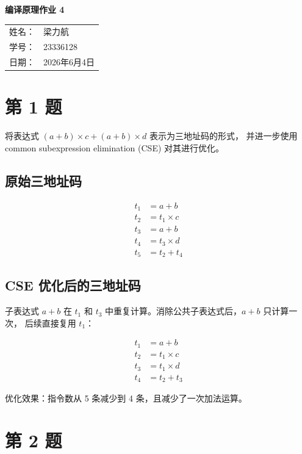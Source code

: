 \documentclass[12pt]{article}
\begin{document}
\begin{center}
    {\LARGE\bfseries 编译原理作业 4\par}
    \vspace{1.0cm}
    {\large
    \begin{tabular}{rl}
    姓名：& 梁力航 \\
    学号：& 23336128 \\
    日期：& 2026年6月4日
    \end{tabular}\par}
\end{center}

\vspace{0.8cm}

\section*{第 1 题}

将表达式 $(a+b) \times c + (a+b) \times d$ 表示为三地址码的形式，
并进一步使用 common subexpression elimination (CSE) 对其进行优化。

\subsection*{原始三地址码}

\[
\begin{array}{ll}
t_1 &= a + b \\
t_2 &= t_1 \times c \\
t_3 &= a + b \\
t_4 &= t_3 \times d \\
t_5 &= t_2 + t_4
\end{array}
\]

\subsection*{CSE 优化后的三地址码}

子表达式 $a+b$ 在 $t_1$ 和 $t_3$ 中重复计算。消除公共子表达式后，$a+b$ 只计算一次，
后续直接复用 $t_1$：

\[
\begin{array}{ll}
t_1 &= a + b \\
t_2 &= t_1 \times c \\
t_3 &= t_1 \times d \\
t_4 &= t_2 + t_3
\end{array}
\]

优化效果：指令数从 5 条减少到 4 条，且减少了一次加法运算。

\section*{第 2 题}
\end{document}
